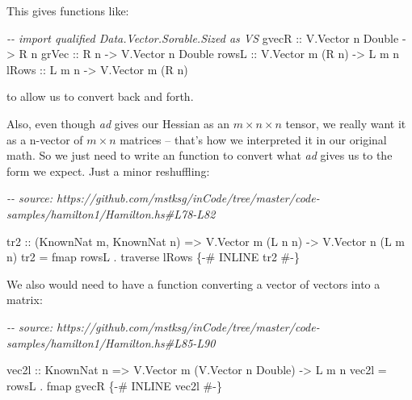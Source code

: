 \documentclass[]{article}
\newenvironment{Shaded}{}{}
\newcommand{\CommentTok}[1]{\textcolor[rgb]{0.38,0.63,0.69}{\textit{#1}}}
\newcommand{\DataTypeTok}[1]{\textcolor[rgb]{0.56,0.13,0.00}{#1}}
\newcommand{\FunctionTok}[1]{\textcolor[rgb]{0.02,0.16,0.49}{#1}}
\newcommand{\NormalTok}[1]{#1}
\newcommand{\OperatorTok}[1]{\textcolor[rgb]{0.40,0.40,0.40}{#1}}
\newcommand{\OtherTok}[1]{\textcolor[rgb]{0.00,0.44,0.13}{#1}}
\begin{document}
This gives functions like:

\begin{Shaded}
\begin{Highlighting}[]
\CommentTok{{-}{-} import qualified Data.Vector.Sorable.Sized as VS}
\OtherTok{gvecR ::} \DataTypeTok{V.Vector}\NormalTok{ n }\DataTypeTok{Double}  \OtherTok{{-}>} \DataTypeTok{R}\NormalTok{ n}
\OtherTok{grVec ::} \DataTypeTok{R}\NormalTok{ n                }\OtherTok{{-}>} \DataTypeTok{V.Vector}\NormalTok{ n }\DataTypeTok{Double}
\OtherTok{rowsL ::} \DataTypeTok{V.Vector}\NormalTok{ m (}\DataTypeTok{R}\NormalTok{ n)   }\OtherTok{{-}>} \DataTypeTok{L}\NormalTok{ m n}
\OtherTok{lRows ::} \DataTypeTok{L}\NormalTok{ m n              }\OtherTok{{-}>} \DataTypeTok{V.Vector}\NormalTok{ m (}\DataTypeTok{R}\NormalTok{ n)}
\end{Highlighting}
\end{Shaded}

to allow us to convert back and forth.

Also, even though \emph{ad} gives our Hessian as an \(m \times n \times n\)
tensor, we really want it as a n-vector of \(m \times n\) matrices -- that's how
we interpreted it in our original math. So we just need to write an function to
convert what \emph{ad} gives us to the form we expect. Just a minor reshuffling:

\begin{Shaded}
\begin{Highlighting}[]
\CommentTok{{-}{-} source: https://github.com/mstksg/inCode/tree/master/code{-}samples/hamilton1/Hamilton.hs\#L78{-}L82}

\OtherTok{tr2 ::}\NormalTok{ (}\DataTypeTok{KnownNat}\NormalTok{ m, }\DataTypeTok{KnownNat}\NormalTok{ n)}
    \OtherTok{=>} \DataTypeTok{V.Vector}\NormalTok{ m (}\DataTypeTok{L}\NormalTok{ n n)}
    \OtherTok{{-}>} \DataTypeTok{V.Vector}\NormalTok{ n (}\DataTypeTok{L}\NormalTok{ m n)}
\NormalTok{tr2 }\OtherTok{=} \FunctionTok{fmap}\NormalTok{ rowsL }\OperatorTok{.} \FunctionTok{traverse}\NormalTok{ lRows}
\OtherTok{\{{-}\# INLINE tr2 \#{-}\}}
\end{Highlighting}
\end{Shaded}

We also would need to have a function converting a vector of vectors into a
matrix:

\begin{Shaded}
\begin{Highlighting}[]
\CommentTok{{-}{-} source: https://github.com/mstksg/inCode/tree/master/code{-}samples/hamilton1/Hamilton.hs\#L85{-}L90}

\NormalTok{vec2l}
\OtherTok{    ::} \DataTypeTok{KnownNat}\NormalTok{ n}
    \OtherTok{=>} \DataTypeTok{V.Vector}\NormalTok{ m (}\DataTypeTok{V.Vector}\NormalTok{ n }\DataTypeTok{Double}\NormalTok{)}
    \OtherTok{{-}>} \DataTypeTok{L}\NormalTok{ m n}
\NormalTok{vec2l }\OtherTok{=}\NormalTok{ rowsL }\OperatorTok{.} \FunctionTok{fmap}\NormalTok{ gvecR}
\OtherTok{\{{-}\# INLINE vec2l \#{-}\}}
\end{Highlighting}
\end{Shaded}
\end{document}
